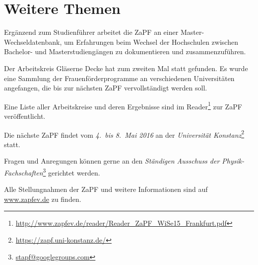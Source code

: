 \section*{Weitere Themen}
Ergänzend zum Studienführer arbeitet die ZaPF an einer Master-Wechseldatenbank,
um Erfahrungen beim Wechsel der Hochschulen zwischen Bachelor- und
Masterstudiengängen zu dokumentieren und zusammenzuführen.

Der Arbeitskreis \glqq{}Gläserne Decke\grqq{} hat zum zweiten Mal statt
gefunden. Es wurde eine Sammlung der Frauenförderprogramme an verschiedenen
Universitäten angefangen, die bis zur nächsten ZaPF vervollständigt werden
soll.

Eine Liste aller Arbeitskreise und deren Ergebnisse sind im
Reader\footnote{\href{http://www.zapfev.de/reader/Reader\_ZaPF\_WiSe15\_Frankfurt.pdf}{\url{http://www.zapfev.de/reader/Reader\_ZaPF\_WiSe15\_Frankfurt.pdf}}}
zur ZaPF veröffentlicht.

\vfill

Die nächste ZaPF findet vom \emph{4.\ bis 8.\ Mai 2016} an der  \emph{Universität Konstanz}\footnote{\href{https://zapf.uni-konstanz.de/}{\url{https://zapf.uni-konstanz.de/}}} statt.

Fragen und Anregungen können gerne an den \emph{Ständigen Ausschuss der Physik-Fachschaften}\footnote{\href{mailto:stapf@googlegroups.com}{\url{stapf@googlegroups.com}}} gerichtet werden.

Alle Stellungnahmen der ZaPF und weitere Informationen sind auf \href{http://www.zapfev.de}{\url{www.zapfev.de}} zu finden. 
